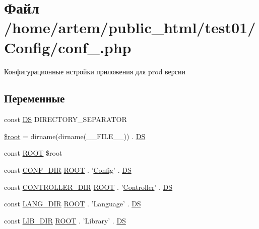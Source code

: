 \hypertarget{conf___8php}{\section{Файл /home/artem/public\-\_\-html/test01/\-Config/conf\-\_\-.php}
\label{conf___8php}
}


Конфигурационные нстройки приложения для prod версии  


\subsection*{Переменные}
\begin{DoxyCompactItemize}
\item 
const \hyperlink{conf___8php_ae073998f73900b8375397889044c8313}{D\-S} D\-I\-R\-E\-C\-T\-O\-R\-Y\-\_\-\-S\-E\-P\-A\-R\-A\-T\-O\-R
\item 
\hyperlink{conf___8php_ab37f7c32f41c3c61ed940887453767f4}{\$root} = dirname(dirname(\-\_\-\-\_\-\-F\-I\-L\-E\-\_\-\-\_\-)) . \hyperlink{conf___8php_ae073998f73900b8375397889044c8313}{D\-S}
\item 
const \hyperlink{conf___8php_a18c0644836e196aed6d63779e14d6bd8}{R\-O\-O\-T} \$root
\item 
const \hyperlink{conf___8php_acc332eaa302e50df333137a1642afc00}{C\-O\-N\-F\-\_\-\-D\-I\-R} \hyperlink{conf___8php_a18c0644836e196aed6d63779e14d6bd8}{R\-O\-O\-T} . '\hyperlink{class_config}{Config}' . \hyperlink{conf___8php_ae073998f73900b8375397889044c8313}{D\-S}
\item 
const \hyperlink{conf___8php_a764bb19c7c9d1c48e90b21b30e1b604a}{C\-O\-N\-T\-R\-O\-L\-L\-E\-R\-\_\-\-D\-I\-R} \hyperlink{conf___8php_a18c0644836e196aed6d63779e14d6bd8}{R\-O\-O\-T} . '\hyperlink{class_controller}{Controller}' . \hyperlink{conf___8php_ae073998f73900b8375397889044c8313}{D\-S}
\item 
const \hyperlink{conf___8php_a62485aa7dd0bdd2703aa8fb69d2ff5d8}{L\-A\-N\-G\-\_\-\-D\-I\-R} \hyperlink{conf___8php_a18c0644836e196aed6d63779e14d6bd8}{R\-O\-O\-T} . 'Language' . \hyperlink{conf___8php_ae073998f73900b8375397889044c8313}{D\-S}
\item 
const \hyperlink{conf___8php_aab9895f0433c9fc8f6980e22ddecbbd2}{L\-I\-B\-\_\-\-D\-I\-R} \hyperlink{conf___8php_a18c0644836e196aed6d63779e14d6bd8}{R\-O\-O\-T} . 'Library' . \hyperlink{conf___8php_ae073998f73900b8375397889044c8313}{D\-S}
\item 

\end{DoxyCompactItemize}
